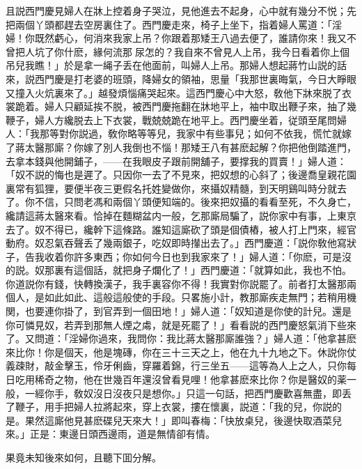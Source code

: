 且説西門慶見婦人在牀上控着身子哭泣，見他進去不起身，心中就有幾分不悦；先把兩個丫頭都趕去空房裏住了。西門慶走來，椅子上坐下，指着婦人罵道：「淫婦！你既然虧心，何消來我家上吊？你跟着那矮王八過去便了，誰請你來！我又不曾把人坑了你什麽，緣何流那𣭈尿怎的？我自來不曾見人上吊，我今日看着你上個吊兒我瞧！」於是拿一䋲子丢在他面前，叫婦人上吊。那婦人想起蔣竹山説的話來，説西門慶是打老婆的班頭，降婦女的領袖，思量「我那世裏晦氣，今日大睜眼又撞入火炕裏來了。」越發煩惱痛哭起來。這西門慶心中大怒，敎他下牀來脱了衣裳跪着。婦人只顧延挨不脱，被西門慶拖翻在牀地平上，袖中取出鞭子來，抽了幾鞭子，婦人方纔脱去上下衣裳，戰兢兢跪在地平上。西門慶坐着，従頭至尾問婦人：「我那等對你説過，敎你略等等兒，我家中有些事兒；如何不依我，慌忙就嫁了蔣太醫那廝？你嫁了別人我倒也不惱！那矮王八有甚麽起解？你把他倒踏進門，去拿本錢與他開鋪子，——在我眼皮子跟前開舖子，要撑我的買賣！」婦人道：「奴不説的悔也是遲了。只因你一去了不見來，把奴想的心斜了；後邊喬皇親花園裏常有狐狸，要便半夜三更假名托姓變做你，來攝奴精髓，到天明鷄叫時分就去了。你不信，只問老馮和兩個丫頭便知端的。後來把奴攝的看看至死，不久身亡，纔請這蔣太醫來看。恰掉在麵糊盆内一般，乞那廝局騙了，説你家中有事，上東京去了。奴不得已，纔幹下這條路。誰知這廝砍了頭是個債樁，被人打上門來，經官動府。奴忍氣吞聲丢了幾兩銀子，吃奴即時攆出去了。」西門慶道：「説你敎他寫狀子，告我收着你許多東西；你如何今日也到我家來了！」婦人道：「你麽，可是沒的説。奴那裏有這個話，就把身子爛化了！」西門慶道：「就算如此，我也不怕。你道説你有錢，快轉換漢子，我手裏容你不得！我實對你説罷了。前者打太醫那兩個人，是如此如此、這般這般使的手段。只畧施小計，教那廝疾走無門；若稍用機関，也要連你掛了，到官弄到一個田地！」婦人道：「奴知道是你使的計兒。還是你可憐見奴，若弄到那無人煙之䖏，就是死罷了！」看看説的西門慶怒氣消下些來了。又問道：「淫婦你過來，我問你：我比蔣太醫那廝誰強？」婦人道：「他拿甚麽來比你！你是個天，他是塊磚，你在三十三天之上，他在九十九地之下。休説你仗義疎財，敲金擊玉，伶牙俐齒，穿羅着錦，行三坐五——這等為人上之人，只你每日吃用稀奇之物，他在世幾百年還沒曾看見哩！他拿甚麽來比你？你是醫奴的薬一般，一經你手，敎奴沒日沒夜只是想你。」只這一句話，把西門慶歡喜無盡，即丢了鞭子，用手把婦人拉將起來，穿上衣裳，摟在懷裏，説道：「我的兒，你説的是。果然這廝他見甚麽碟兒天來大！」即叫春梅：「快放桌兒，後邊快取酒菜兒來。」正是：東邊日頭西邊雨，道是無情卻有情。

果竟未知後來如何，且聽下囬分解。

